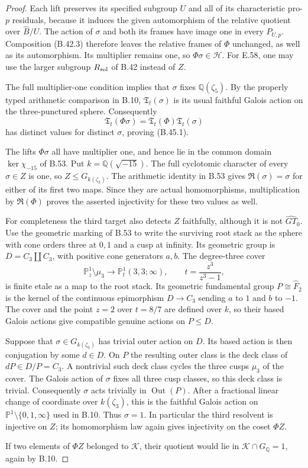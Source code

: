 \begin{proof}
Each lift preserves its
specified subgroup $U$ and
all of its characteristic
pro-$p$ residuals, because
it induces the given
automorphism of the relative
quotient over $\widehat B/U$.
The action of $\sigma$ and
both its frames have image
one in every $P_{U,p}$.
Composition (B.42.3) therefore
leaves the relative frames
of $\Phi$ unchanged, as
well as its automorphism.
Its multiplier remains one,
so $\Phi\sigma\in\mathcal H$.
For E.58, one may use the
larger subgroup $R_{\rm sol}$
of B.42 instead of $Z$.

The full multiplier-one
condition implies that
$\sigma$ fixes $\mathbb Q(\zeta_5)$.
By the properly typed
arithmetic comparison in
B.10, $\mathfrak T_t(\sigma)$
is its usual faithful
Galois action on the
three-punctured sphere.
Consequently
\[
 \mathfrak T_t(\Phi\sigma)
       =\mathfrak T_t(\Phi)\mathfrak T_t(\sigma)
\]
has distinct values for
distinct $\sigma$, proving
(B.45.1).

The lifts $\Phi\sigma$ all have
multiplier one, and hence lie
in the common domain
$\ker\chi_{-15}$ of B.53.
Put $k=\mathbb Q(\sqrt{-15})$.
The full cyclotomic character
of every $\sigma\in Z$ is one,
so $Z\leq G_{k(\zeta_3)}$.
The arithmetic identity in
B.53 gives
$\mathfrak R(\sigma)=\sigma$
for either of its first two
maps.  Since they are actual
homomorphisms, multiplication
by $\mathfrak R(\Phi)$ proves
the asserted injectivity for
these two values as well.

For completeness the third
target also detects $Z$
faithfully, although it is
not $\widehat{GT}_0$.
Use the geometric marking of
B.53 to write the surviving
root stack as the sphere
with cone orders three at
$0,1$ and a cusp at infinity.
Its geometric group is
$D=C_3\amalg C_3$, with positive
cone generators $a,b$.  The
degree-three cover
\[
 \mathbb P^1_z\setminus\mu_3
       \longrightarrow \mathbb P^1_t(3,3;\infty),
 \qquad t=\frac{z^3}{z^3-1},                               \tag{B.45.2}
\]
is finite etale as a map to
the root stack.  Its geometric
fundamental group $P\cong\widehat F_2$
is the kernel of the continuous
epimorphism $D\to C_3$ sending
$a$ to $1$ and $b$ to $-1$.
The cover and the point $z=2$
over $t=8/7$ are defined over
$k$, so their based Galois
actions give compatible genuine
actions on $P\leq D$.

Suppose that $\sigma\in G_{k(\zeta_3)}$
has trivial outer action on $D$.
Its based action is then
conjugation by some $d\in D$.
On $P$ the resulting outer
class is the deck class of
$dP\in D/P=C_3$.  A nontrivial
such deck class cycles the
three cusps $\mu_3$ of the cover.
The Galois action of $\sigma$
fixes all three cusp classes,
so this deck class is trivial.
Consequently $\sigma$ acts
trivially in $\operatorname{Out}(P)$.
After a fractional linear
change of coordinate over
$k(\zeta_3)$, this is the
faithful Galois action on
$\mathbb P^1\setminus\{0,1,\infty\}$
used in B.10.  Thus $\sigma=1$.
In particular the third
resolvent is injective on $Z$;
its homomorphism law again
gives injectivity on the
coset $\Phi Z$.

If two elements
of $\Phi Z$ belonged to
$\mathcal K$, their quotient
would lie in
$\mathcal K\cap G_{\mathbb Q}=1$,
again by B.10.
\end{proof}

